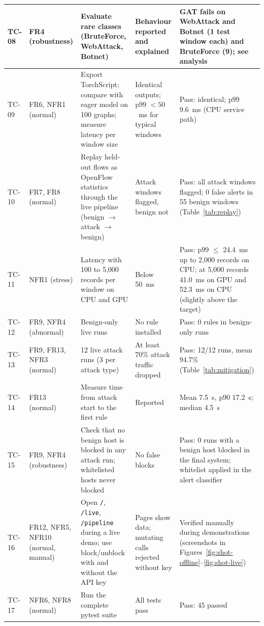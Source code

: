 \begin{longtable}{|p{1.2cm}|p{2.6cm}|p{3.1cm}|p{3.6cm}|p{3.0cm}|}
TC-08 & FR4 (robustness) & Evaluate rare classes (BruteForce, WebAttack, Botnet) & Behaviour reported and explained & GAT fails on WebAttack and Botnet (1 test window each) and BruteForce (9); see analysis \\ \hline
TC-09 & FR6, NFR1 (normal) & Export TorchScript; compare with eager model on 100 graphs; measure latency per window size & Identical outputs; p99 $<50$~ms for typical windows & Pass: identical; p99 9.6~ms (CPU service path) \\ \hline
TC-10 & FR7, FR8 (normal) & Replay held-out flows as OpenFlow statistics through the live pipeline (benign $\to$ attack $\to$ benign) & Attack windows flagged, benign not & Pass: all attack windows flagged; 0 false alerts in 55 benign windows (Table~\ref{tab:replay}) \\ \hline
TC-11 & NFR1 (stress) & Latency with 100 to 5,000 records per window on CPU and GPU & Below 50~ms & Pass: p99 $\le$ 24.4~ms up to 2,000 records on CPU; at 5,000 records 41.0~ms on GPU and 52.3~ms on CPU (slightly above the target) \\ \hline
TC-12 & FR9, NFR4 (abnormal) & Benign-only live runs & No rule installed & Pass: 0 rules in benign-only runs \\ \hline
TC-13 & FR9, FR13, NFR3 (normal) & 12 live attack runs (3 per attack type) & At least 70\% attack traffic dropped & Pass: 12/12 runs, mean 94.7\% (Table~\ref{tab:mitigation}) \\ \hline
TC-14 & FR13 (normal) & Measure time from attack start to the first rule & Reported & Mean 7.5~s, p90 17.2~s; median 4.5~s \\ \hline
TC-15 & FR9, NFR4 (robustness) & Check that no benign host is blocked in any attack run; whitelisted hosts never blocked & No false blocks & Pass: 0 runs with a benign host blocked in the final system; whitelist applied in the alert classifier \\ \hline
TC-16 & FR12, NFR5, NFR10 (normal, manual) & Open \texttt{/}, \texttt{/live}, \texttt{/pipeline} during a live demo; use block/unblock with and without the API key & Pages show data; mutating calls rejected without key & Verified manually during demonstrations (screenshots in Figures~\ref{fig:shot-offline}--\ref{fig:shot-live}) \\ \hline
TC-17 & NFR6, NFR8 (normal) & Run the complete pytest suite & All tests pass & Pass: 45 passed \\ \hline
\end{longtable}

